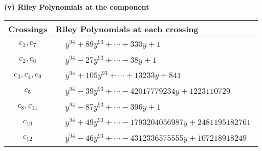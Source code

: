 \documentclass[1p]{elsarticle_modified}
\theoremstyle{definition}
\begin{document}
\flushleft \textbf{(v) Riley Polynomials at the component}\newline \\
\begin{tabular}{m{50pt}|m{274pt}}
Crossings & \hspace{64pt}Riley Polynomials at each crossing \\
\hline $$\begin{aligned}c_{1},c_{7}\end{aligned}$$&$\begin{aligned}
&y^{94}+89 y^{93}+\cdots+330 y+1
\end{aligned}$\\
\hline $$\begin{aligned}c_{2},c_{6}\end{aligned}$$&$\begin{aligned}
&y^{94}-27 y^{93}+\cdots-38 y+1
\end{aligned}$\\
\hline $$\begin{aligned}c_{3},c_{4},c_{9}\end{aligned}$$&$\begin{aligned}
&y^{94}+105 y^{93}+\cdots+13233 y+841
\end{aligned}$\\
\hline $$\begin{aligned}c_{5}\end{aligned}$$&$\begin{aligned}
&y^{94}-39 y^{93}+\cdots-42017779234 y+1223110729
\end{aligned}$\\
\hline $$\begin{aligned}c_{8},c_{11}\end{aligned}$$&$\begin{aligned}
&y^{94}-87 y^{93}+\cdots-396 y+1
\end{aligned}$\\
\hline $$\begin{aligned}c_{10}\end{aligned}$$&$\begin{aligned}
&y^{94}+49 y^{93}+\cdots-1793204056987 y+2481195182761
\end{aligned}$\\
\hline $$\begin{aligned}c_{12}\end{aligned}$$&$\begin{aligned}
&y^{94}-46 y^{93}+\cdots-4312336575555 y+107218918249
\end{aligned}$\\
\hline
\end{tabular}\\~\\
\end{document}
